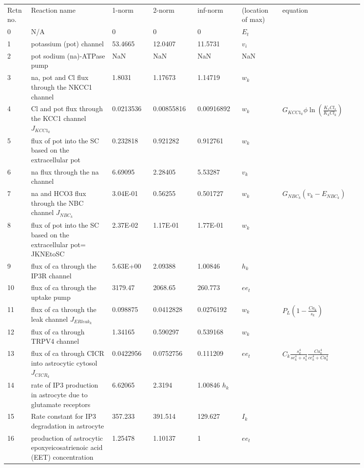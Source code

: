 \documentclass[]{article}
\newcommand{\na}{\gls{na}\xspace}
\newcommand{\pot}{\gls{pot}\xspace}
\newcommand{\ca}{\gls{ca}\xspace}
\begin{document}
\begin{longtable}[h!] { p{0.05\linewidth}  p{0.2\linewidth} p{0.1\linewidth}  p{0.10\linewidth} p{0.10\linewidth} p{0.1\linewidth}   p{0.2\linewidth} }
\hline
Rctn no.	&	Reaction name &1-norm&2-norm&inf-norm&(location of max) & equation\\
0& 	N/A	&0	&	0	&	0&	$E_t$&\\
1	&potassium (\pot) channel&	53.4665&		12.0407&		11.5731&	$v_i$ & \\
2	&\pot sodium (\na)-ATPase pump&	NaN	&	NaN	&	NaN	&NaN\\
3	&\na, \pot and Cl flux through the NKCC1 channel&	1.8031	&	1.17673	&	1.14719	&$w_k$\\
4&	Cl and \pot flux through the KCC1 channel $J_{KCC1_k}$	&0.0213536	&	0.00855816	&	0.00916892&	$w_k$ &$G_{KCC1_k} \phi \ln \left(\frac{K_s Cl_s }{K_k Cl_k}\right)$\\
5&	flux of \pot into the SC based on the extracellular \pot&	0.232818&		0.921282	&	0.912761&	$w_k$\\
6&	\na flux through the \na channel &	6.69095	&	2.28405	&	5.53287&	$v_k$\\
7&	\na and HCO3 flux through the NBC channel $J_{NBC_k}$	&3.04E-01	&	0.56255	&	0.501727&	$w_k$ &$G_{NBC_k}\left(  v_k -E_{NBC_k}  \right)$\\
8&	flux of \pot into the SC based on the extracellular \pot = JKNEtoSC	&2.37E-02	&	1.17E-01	&	1.77E-01&	$w_k$\\
9&	flux of \ca through the IP3R channel&	5.63E+00	&	2.09388	&	1.00846&	$h_k$\\
10	&flux of \ca through the uptake pump&	3179.47	&	2068.65	&	260.773	&$ee_t$\\
11	&flux of \ca through the leak channel	$J_{ERleak_k} $&0.098875	&	0.0412828	&	0.0276192&	$w_k$ &$P_L \left(  1 - \frac{Ca_k}{s_k}  \right)$ \\
12	&flux of \ca through TRPV4 channel	&1.34165	&	0.590297	&	0.539168&	$w_k$& \\
13&	flux of \ca through CICR into astrocytic cytosol $J_{CICR_k}$&	0.0422956	&	0.0752756	&	0.111209&	$ee_t$&$C_k\frac{s_k^{4}}{sc_k^4+s_k^4}\frac{Ca_k^4}{cc_k^4+Ca_k^4}$ \\
14&	rate of IP3 production in astrocyte due to glutamate receptors&	6.62065	&	2.3194	&	1.00846	$h_k$&\\
15&	Rate constant for IP3 degradation in astrocyte	&357.233	&	391.514	&	129.627&	$I_k$&\\
16&	production of astrocytic epoxyeicosatrienoic acid (EET) concentration&	1.25478	&	1.10137	&	1&	$ee_t$&\\

\end{longtable}
\end{document}
